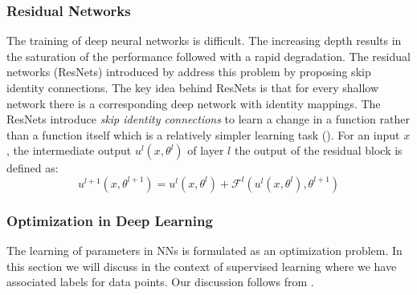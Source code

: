 \subsubsection{Residual Networks}
\label{sub:resnet}
The training of deep neural networks is difficult. The increasing depth results in the saturation of the performance followed with a rapid degradation. The residual networks (ResNets) introduced by \citet{he2016deep} address this problem by proposing skip identity connections. The key idea behind ResNets is that for every shallow network there is a corresponding deep network with identity mappings. The ResNets introduce \emph{skip identity connections} to learn a change in a function rather than a function itself which is a relatively simpler learning task (\cite{he2016identity}). For an input $x$, the intermediate output $u^l(x,\theta^l)$ of layer $l$ the output of the residual block is defined as:
\begin{equation}
\label{eq:res}
    u^{l+1}(x,\theta^{l+1}) =  u^{l}(x,\theta^l) + \mathcal{F}^l(u^{l}(x,\theta^{l}), \theta^{l+1})
\end{equation}




\subsubsection{Optimization in Deep Learning}
\label{sub:mll}
The learning of parameters in NNs is formulated as an optimization problem. In this section we will discuss in the context of supervised learning where we have associated labels for data points. Our discussion follows from \citet{mitchell1990machine}.


